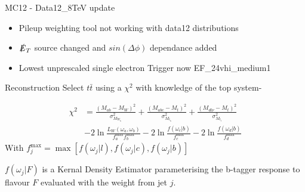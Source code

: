 \documentclass{beamer}
\begin{document}

\begin{frame}{MC12 - Data12\_8TeV update}
\begin{itemize}
    \item Pileup weighting tool not working with data12 distributions
    \item $\slashed{E}_{T}$ source changed and $sin(\Delta\phi)$ dependance added
    \item Lowest unprescaled single electron Trigger now EF\_24vhi\_medium1
\end{itemize}
\end{frame}

\begin{frame}{Reconstruction}
Select $t\bar{t}$ using a $\chi^2$ with knowledge of the top system-

\begin{equation}\begin{split}
  \chi^2 &= \frac{\left(M_{ab} - M_W\right)^2}{\sigma^2_{M_{W_h}}} + \frac{\left(M_{abc} - M_t\right)^2}{\sigma^2_{M_{t_h}}} + \frac{\left(M_{dl\nu} - M_t\right)^2}{\sigma^2_{M_{t_l}}} \\
  &-2\ln{\frac{L_{W}\left( \omega_{a},\omega_{b} \right)}{f^{\text{max}}_{a} f^{\text{max}}_{b}}} -2\ln{\frac{f\left(\omega_{c} \big| b\right)}{f^{\text{max}}_{c}}} -2\ln{\frac{f\left(\omega_{d} \big| b\right)}{f^{\text{max}}_{d}}}
\end{split}\end{equation}
With $f^{\text{max}}_j = \max\left[f\left(\omega_{j} \big| l\right), f\left(\omega_{j} \big| c\right), f\left(\omega_{j} \big| b\right)\right]$

$f\left( \omega_{j} \big| F\right)$ is a Kernal Density Estimator parameterising the b-tagger response to flavour $F$ evaluated with the weight from jet $j$.
\end{frame}
\end{document}
